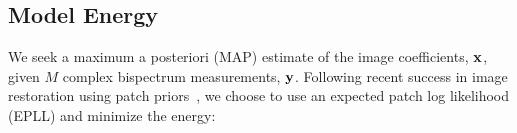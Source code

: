 {%
%
%
%
%

\subsection{Model Energy}

We seek a maximum a posteriori (MAP) estimate of the image coefficients, ${\bf x}$, given $M$ complex bispectrum measurements, ${\bf y}$.
Following recent success in image restoration using patch priors~\cite{zoran2011learning, zoran2012natural}, we choose to use an expected patch log likelihood (EPLL) and minimize the energy:

}

